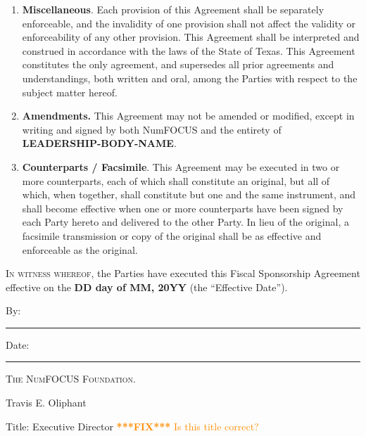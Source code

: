 \documentclass[english,letterpaper,12pt]{article}
\newcommand{\fix}[1]{
  \textcolor{darkorange} { \textbf{***FIX***} #1 } }
\newcommand{\signatories}{\textbf{SIGNATORIES}}
\newcommand{\leadershipbody}{\textbf{LEADERSHIP-BODY-NAME}}
\newcommand{\agreementdate}{\textbf{DD day of MM, 20YY}}
\begin{document}
\begin{enumerate}[label=\arabic*.,ref=\S~\arabic*]
\begin{enumerate}[label=\alph*.,ref=\theenumi(\arabic*)]
\item \textbf{Termination Without a Successor}. If no Successor is found,
  NumFOCUS may dispose of Project assets and liabilities in any manner
  consistent with applicable tax and charitable trust laws.

\item \textbf{\signatories{}' Right to Terminate.}  The \signatories{} hereby
  acknowledge that they will relinquish any rights to terminate separate from
  the \leadershipbody{} as of the Effective Date.

\end{enumerate}

\item \textbf{Miscellaneous}. Each provision of this Agreement shall be
  separately enforceable, and the invalidity of one provision shall not affect
  the validity or enforceability of any other provision.  This Agreement shall
  be interpreted and construed in accordance with the laws of the State of
  Texas. This Agreement constitutes the only agreement, and supersedes all
  prior agreements and understandings, both written and oral, among the Parties
  with respect to the subject matter hereof.

\item \textbf{Amendments. }This Agreement may not be amended or modified,
  except in writing and signed by both NumFOCUS and the entirety of
  \leadershipbody{}.

\item \textbf{Counterparts / Facsimile}. This Agreement may be executed in two
  or more counterparts, each of which shall constitute an original, but all of
  which, when together, shall constitute but one and the same instrument, and
  shall become effective when one or more counterparts have been signed by each
  Party hereto and delivered to the other Party.  In lieu of the original, a
  facsimile transmission or copy of the original shall be as effective and
  enforceable as the original.

\end{enumerate}

\vfill{}


\textsc{In witness whereof}, the Parties have executed this Fiscal
Sponsorship Agreement effective on the \agreementdate{} (the
``Effective Date'').

\vspace{3em}


By: \hspace{0.95em}\rule{0.50\textwidth}{0.2mm} \hfill{}Date: \rule{0.25\textwidth}{0.2mm}

\hspace{2.5em} \textsc{The NumFOCUS Foundation.}

\hspace{2.5em} Travis E. Oliphant

\hspace{2.5em} Title: Executive Director \fix{Is this title correct?} \\[6ex]

\vspace{2ex}


\end{document}
